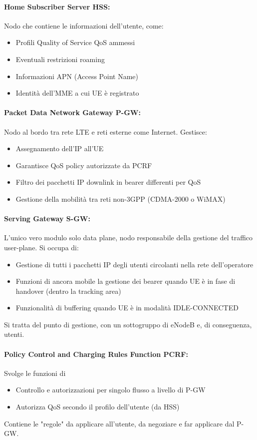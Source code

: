 \newpage

\paragraph{Home Subscriber Server HSS:} Nodo che contiene le informazioni dell'utente, come: 
\begin{itemize}
	\item Profili Quality of Service QoS ammessi
	\item Eventuali restrizioni roaming
	\item Informazioni APN (Access Point Name)
	\item Identità dell'MME a cui UE è registrato
\end{itemize}

\paragraph{Packet Data Network Gateway P-GW:} Nodo al bordo tra rete LTE e reti esterne come Internet. Gestisce: 
\begin{itemize}
	\item Assegnamento dell'IP all'UE
	\item Garantisce QoS policy autorizzate da PCRF
	\item Filtro dei pacchetti IP downlink in bearer differenti per QoS
	\item Gestione della mobilità tra reti non-3GPP (CDMA-2000 o WiMAX)
\end{itemize}

\paragraph{Serving Gateway S-GW:} L'unico vero modulo solo data plane, nodo responsabile della gestione del traffico user-plane. Si occupa di:
\begin{itemize}
	\item Gestione di tutti i pacchetti IP degli utenti circolanti nella rete dell'operatore
	\item Funzioni di ancora mobile la gestione dei bearer quando UE è in fase di handover (dentro la tracking area)
	\item Funzionalità di buffering quando UE è in modalità IDLE-CONNECTED
\end{itemize}
Si tratta del punto di gestione, con un sottogruppo di eNodeB e, di conseguenza, utenti.\\

\paragraph{Policy Control and Charging Rules Function PCRF:} Svolge le funzioni di 
\begin{itemize}
	\item Controllo e autorizzazioni per singolo flusso a livello di P-GW
	\item Autorizza QoS secondo il profilo dell'utente (da HSS)
\end{itemize}
Contiene le "regole" da applicare all'utente, da negoziare e far applicare dal P-GW.\\

